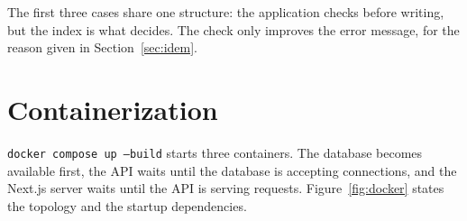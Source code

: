 \documentclass[11pt,a4paper]{article}
\newcommand{\code}[1]{\texttt{\fontsize{8.6}{10}\selectfont #1}}
\begin{document}
The first three cases share one structure: the application checks before
writing, but the index is what decides. The check only improves the error
message, for the reason given in Section~\ref{sec:idem}.

\section{Containerization}

\code{docker compose up --build} starts three containers. The database becomes
available first, the API waits until the database is accepting connections, and
the Next.js server waits until the API is serving requests.
Figure~\ref{fig:docker} states the topology and the startup dependencies.
\end{document}
